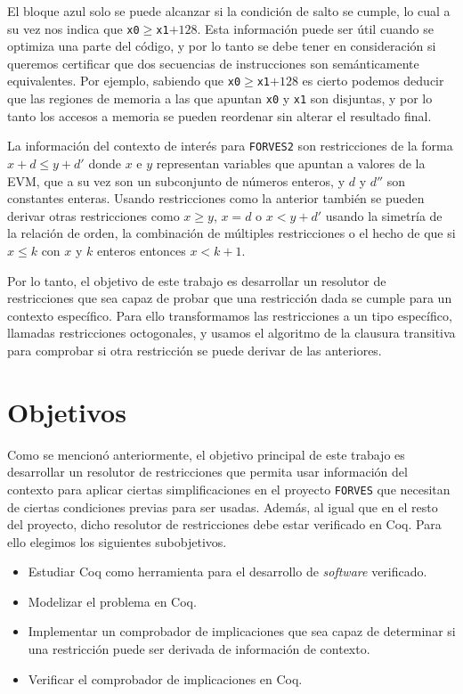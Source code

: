 El bloque azul solo se puede alcanzar si la condición de salto se cumple, lo cual a su
vez nos indica que \texttt{x0}$\ge$\texttt{x1}$+128$. Esta información puede ser útil
cuando se optimiza una parte del código, y por lo tanto se debe tener en consideración
si queremos certificar que dos secuencias de instrucciones son semánticamente 
equivalentes. Por ejemplo, sabiendo que \texttt{x0}$\ge$\texttt{x1}$+128$ es cierto
podemos deducir que las regiones de memoria a las que apuntan \texttt{x0} y \texttt{x1}
son disjuntas, y por lo tanto los accesos a memoria se pueden reordenar sin alterar
el resultado final.

La información del contexto de interés para \verb|FORVES2| son restricciones de la forma
$x + d \le y + d'$ donde $x$ e $y$ representan variables que apuntan a valores de la EVM,
que a su vez son un subconjunto de números enteros, y $d$ y $d''$ son constantes enteras.
Usando restricciones como la anterior también se pueden derivar otras restricciones como
$x \ge  y$, $x = d$ o $x < y + d'$ usando la simetría de la relación de orden, la 
combinación de múltiples restricciones o el hecho de que si $x \le k$ con $x$ y $k$ 
enteros entonces $x < k + 1$.

Por lo tanto, el objetivo de este trabajo es desarrollar un resolutor de restricciones que
sea capaz de probar que una restricción dada se cumple para un contexto específico. Para
ello transformamos las restricciones a un tipo específico, llamadas restricciones octogonales,
y usamos el algoritmo de la clausura transitiva para comprobar si otra restricción se puede
derivar de las anteriores.

\section{Objetivos}

Como se mencionó anteriormente, el objetivo principal de este trabajo es desarrollar un
resolutor de restricciones que permita usar información del contexto para aplicar ciertas
simplificaciones en el proyecto \verb|FORVES| que necesitan de ciertas condiciones previas
para ser usadas. Además, al igual que en el resto del proyecto, dicho resolutor de
restricciones debe estar verificado en Coq. Para ello elegimos los siguientes subobjetivos.

\begin{itemize}
    \item Estudiar Coq como herramienta para el desarrollo de \emph{software} verificado.
    \item Modelizar el problema en Coq.
    \item Implementar un comprobador de implicaciones que sea capaz de determinar si una
          restricción puede ser derivada de información de contexto.
    \item Verificar el comprobador de implicaciones en Coq.
\end{itemize}

